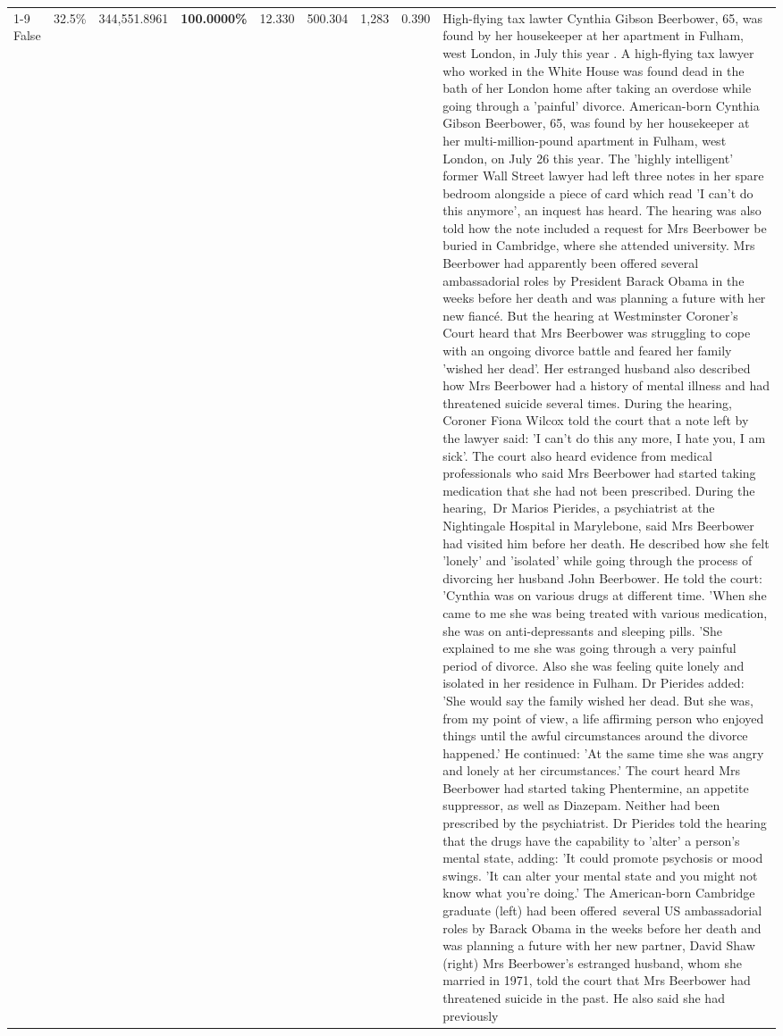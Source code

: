 \begin{table}[H]
\begin{tabular}{lllrlllll}
\cline{1-9}
False & 32.5\% & 344,551.8961 & \bfseries \color{red} 100.0000\% & 12.330 & 500.304 & 1,283 & 0.390 & High-flying tax lawter Cynthia Gibson Beerbower, 65, was found by her housekeeper at her apartment in Fulham, west London, in July this year . A high-flying tax lawyer who worked in the White House was found dead in the bath of her London home after taking an overdose while going through a 'painful' divorce. American-born Cynthia Gibson Beerbower, 65, was found by her housekeeper at her multi-million-pound apartment in Fulham, west London, on July 26 this year. The 'highly intelligent' former Wall Street lawyer had left three notes in her spare bedroom alongside a piece of card which read 'I can't do this anymore', an inquest has heard. The hearing was also told how the note included a request for Mrs Beerbower be buried in Cambridge, where she attended university. Mrs Beerbower had apparently been offered several ambassadorial roles by President Barack Obama in the weeks before her death and was planning a future with her new fiancé. But the hearing at Westminster Coroner's Court heard that Mrs Beerbower was struggling to cope with an ongoing divorce battle and feared her family 'wished her dead'. Her estranged husband also described how Mrs Beerbower had a history of mental illness and had threatened suicide several times. During the hearing, Coroner Fiona Wilcox told the court that a note left by the lawyer said: 'I can't do this any more, I hate you, I am sick'. The court also heard evidence from medical professionals who said Mrs Beerbower had started taking medication that she had not been prescribed. During the hearing, Dr Marios Pierides, a psychiatrist at the Nightingale Hospital in Marylebone, said Mrs Beerbower had visited him before her death. He described how she felt 'lonely' and 'isolated' while going through the process of divorcing her husband John Beerbower. He told the court: 'Cynthia was on various drugs at different time. 'When she came to me she was being treated with various medication, she was on anti-depressants and sleeping pills. 'She explained to me she was going through a very painful period of divorce. Also she was feeling quite lonely and isolated in her residence in Fulham. Dr Pierides added: 'She would say the family wished her dead. But she was, from my point of view, a life affirming person who enjoyed things until the awful circumstances around the divorce happened.' He continued: 'At the same time she was angry and lonely at her circumstances.' The court heard Mrs Beerbower had started taking Phentermine, an appetite suppressor, as well as Diazepam. Neither had been prescribed by the psychiatrist. Dr Pierides told the hearing that the drugs have the capability to 'alter' a person's mental state, adding: 'It could promote psychosis or mood swings. 'It can alter your mental state and you might not know what you're doing.' The American-born Cambridge graduate (left) had been offered several US ambassadorial roles by Barack Obama in the weeks before her death and was planning a future with her new partner, David Shaw (right) Mrs Beerbower's estranged husband, whom she married in 1971, told the court that Mrs Beerbower had threatened suicide in the past. He also said she had previously 
\end{tabular}
\end{table}
